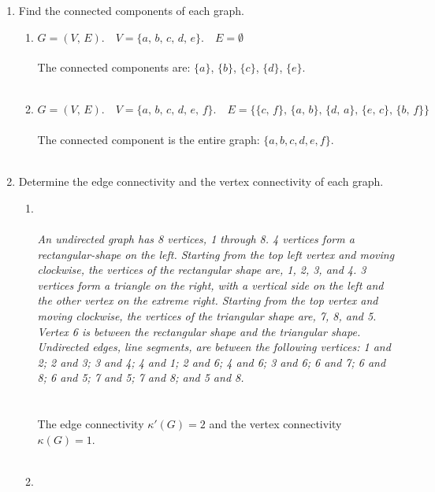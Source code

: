 \documentclass{amsart}
\theoremstyle{definition}
\theoremstyle{Exercise}
\theoremstyle{remark}
\theoremstyle{rule}
\numberwithin{equation}{section}
\begin{document}
\begin{enumerate}[label=(\alph*)]
\item Find the connected components of each graph.\\
    \begin{enumerate}[label=(\roman*)]
    \item $G = (V, \,E).\quad V = \{a,\, b,\, c,\, d,\,  e\}.\quad E = \emptyset$\\\\
The connected components are: $\{a\}$, $\{b\}$, $\{c\}$, $\{d\}$, $\{e\}$.
\\\\
    \item $G = (V,\, E).\quad V = \{a,\, b,\, c,\, d,\, e,\, f\}.\quad E = \{ \{c,\, f\}, \,\{a,\, b\},\, \{d,\, a\}, \,\{e,\, c\},\, \{b,\, f\} \}$\\\\
The connected component is the entire graph: $\{a, b, c, d, e, f\}$.
\\\\
    \end{enumerate}
\item Determine the edge connectivity and the vertex connectivity of each graph.\\

    \begin{enumerate}[label=(\roman*)]    
 \item
{}
\\\\
{\color{blue}{\bf Figure 7:} \emph{An undirected graph has 8 vertices, 1 through 8. 4 vertices form a rectangular-shape on the left. Starting from the top left vertex and moving clockwise, the vertices of the rectangular shape are, 1, 2, 3, and 4. 3 vertices form a triangle on the right, with a vertical side on the left and the other vertex on the extreme right. Starting from the top vertex and moving clockwise, the vertices of the triangular shape are, 7, 8, and 5. Vertex 6 is between the rectangular shape and the triangular shape. Undirected edges, line segments, are between the following vertices: 1 and 2; 2 and 3; 3 and 4; 4 and 1; 2 and 6; 4 and 6; 3 and 6; 6 and 7; 6 and 8; 6 and 5; 7 and 5; 7 and 8; and 5 and 8.
\\
}
}
\\
\\
The edge connectivity $\kappa'(G) = 2$ and the vertex connectivity $\kappa(G) = 1$.
\\\\
\newpage
\item  


\end{enumerate}
\end{enumerate}
\end{document}
